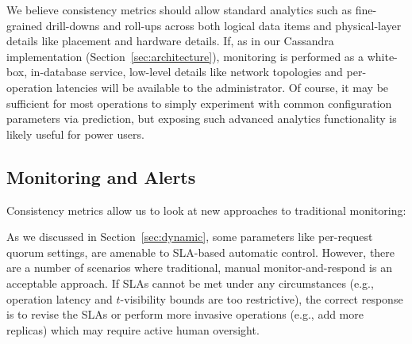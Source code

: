 We believe consistency metrics should allow standard analytics such as
fine-grained drill-downs and roll-ups across both logical data items
and physical-layer details like placement and hardware details. If, as
in our Cassandra implementation (Section~\ref{sec:architecture}),
monitoring is performed as a white-box, in-database service, low-level
details like network topologies and per-operation latencies will be
available to the administrator. Of course, it may be sufficient for most
operations to simply experiment with common configuration parameters via
prediction, but exposing such advanced analytics functionality is
likely useful for power users.

\subsection{Monitoring and Alerts}
\label{sec:monitoring}

Consistency metrics allow us to look at new approaches to traditional monitoring:


As we discussed in Section~\ref{sec:dynamic}, some parameters like
per-request quorum settings, are amenable to SLA-based automatic
control. However, there are a number of scenarios where traditional,
manual monitor-and-respond is an acceptable approach. If SLAs cannot
be met under any circumstances (e.g., operation latency and
$t$-visibility bounds are too restrictive), the correct response is to
revise the SLAs or perform more invasive operations (e.g., add more
replicas) which may require active human oversight.
